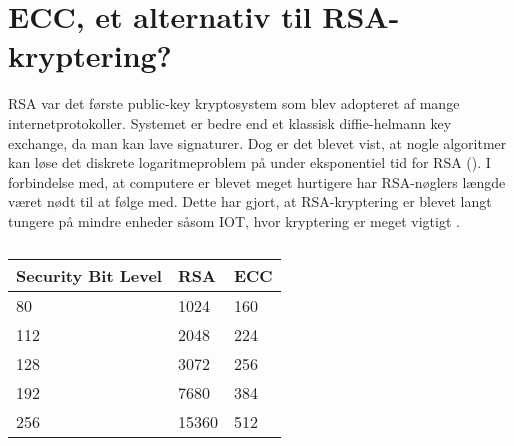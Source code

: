 \section{ECC, et alternativ til RSA-kryptering?}
RSA var det første public-key kryptosystem som blev adopteret af mange internetprotokoller. Systemet er bedre end et klassisk diffie-helmann key exchange, da man kan lave signaturer. Dog er det blevet vist, at nogle algoritmer kan løse det diskrete logaritmeproblem på under eksponentiel tid for RSA (\cite{carlpomerance1987}). I forbindelse med, at computere er blevet meget hurtigere har RSA-nøglers længde været nødt til at følge med. Dette har gjort, at RSA-kryptering er blevet langt tungere på mindre enheder såsom IOT, hvor kryptering er meget vigtigt \cite{nilsguraarunpatel2004}. 

\begin{table}[htbp]
\centering
\begin{tabular}{lll}
\toprule
\textbf{Security Bit Level} & \textbf{RSA} & \textbf{ECC} \\ \midrule
80                          & 1024         & 160          \\ 
112                         & 2048         & 224          \\ 
128                         & 3072         & 256          \\ 
192                         & 7680         & 384          \\ 
256                         & 15360        & 512          \\ 
\bottomrule
\end{tabular}
\caption{\cite{mahto}}
\label{tab:RSAvsECC}
\end{table}


